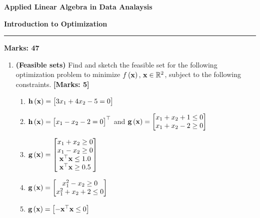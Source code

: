 \documentclass[12pt]{article}
\def\mf{\ensuremath\mathbf}
\def\mb{\ensuremath\mathbb}
\def\lp{\ensuremath\left(}
\def\rp{\ensuremath\right)}
\def\bmx{\ensuremath\begin{bmatrix*}[r]}
\def\emx{\ensuremath\end{bmatrix*}}
\def\bmxc{\ensuremath\begin{bmatrix*}[c]}
\newcommand{\ct}[1]{\lp #1\rp}
\begin{document}
\begin{center}
\begin{large}
\textbf{Applied Linear Algebra in Data Analaysis}\\
\vspace{0.1cm}
\end{large}
\textbf{Introduction to Optimization}
\end{center}
\hrule
\vspace{1em}

\begin{large}
    \textbf{Marks: 47}
\end{large}


\begin{enumerate}
    \item \textbf{(Feasible sets)} Find and sketch the feasible set for the following optimization problem to minimize $f\ct{\mf{x}}, \, \mf{x} \in \mb{R}^2$, subject to the following constraints. \textbf{[Marks: 5]}
    \begin{enumerate}
        \item $\mf{h}\ct{\mf{x}} = \bmx 3x_1 + 4x_2 - 5 = 0\emx$
        \item $\mf{h}\ct{\mf{x}} = \bmx x_1 - x_2 - 2 = 0\emx^\top$ and $\mf{g}\ct{\mf{x}} = \bmx x_1 + x_2 + 1 \leq 0 \\ x_1 + x_2 - 2 \geq 0 \emx$
        \item $\mf{g}\ct{\mf{x}} = \bmxc x_1 + x_2 \geq 0 \\ x_1 - x_2 \geq 0 \\ \mf{x}^\top\mf{x} \leq 1.0 \\ \mf{x}^\top\mf{x} \geq 0.5\emx$
        \item $\mf{g}\ct{\mf{x}} = \bmxc x_1^2 - x_2 \geq 0 \\ x_1^2 + x_2 + 2 \leq 0 \emx$
        \item $\mf{g}\ct{\mf{x}} = \bmxc -\mf{x}^\top\mf{x} \leq 0 \emx$
    \end{enumerate}


\end{enumerate}
\end{document}
